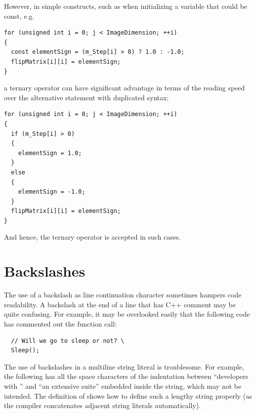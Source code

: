 However, in simple constructs, such as when initializing a variable that could
be const, e.g.

\small
\begin{verbatim}
for (unsigned int i = 0; j < ImageDimension; ++i)
{
  const elementSign = (m_Step[i] > 0) ? 1.0 : -1.0;
  flipMatrix[i][i] = elementSign;
}
\end{verbatim}
\normalsize

a ternary operator can have significant advantage in terms of the reading speed
over the alternative  statement with duplicated syntax:

\small
\begin{verbatim}
for (unsigned int i = 0; j < ImageDimension; ++i)
{
  if (m_Step[i] > 0)
  {
    elementSign = 1.0;
  }
  else
  {
    elementSign = -1.0;
  }
  flipMatrix[i][i] = elementSign;
}
\end{verbatim}
\normalsize

And hence, the ternary operator is accepted in such cases.


\section{Backslashes}%
\label{sec:Backslashes}

The use of a backslash as line continuation character sometimes
hampers code readability. A backslash at the end of a line that has C++ \code{//}
comment may be quite confusing. For example, it may be overlooked easily that
the following code has commented out the  function call:

\small
\begin{verbatim}
  // Will we go to sleep or not? \
  Sleep();
\end{verbatim}
\normalsize

The use of backslashes in a multiline string literal is
troublesome. For example, the following  has all the space
characters of the indentation between \enquote{developers with } and \enquote{an extensive suite}
embedded inside the string, which may not be intended. The definition of
\code{goodDescription} shows how to define such a lengthy string properly (as
the compiler concatenates adjacent string literals automatically).

